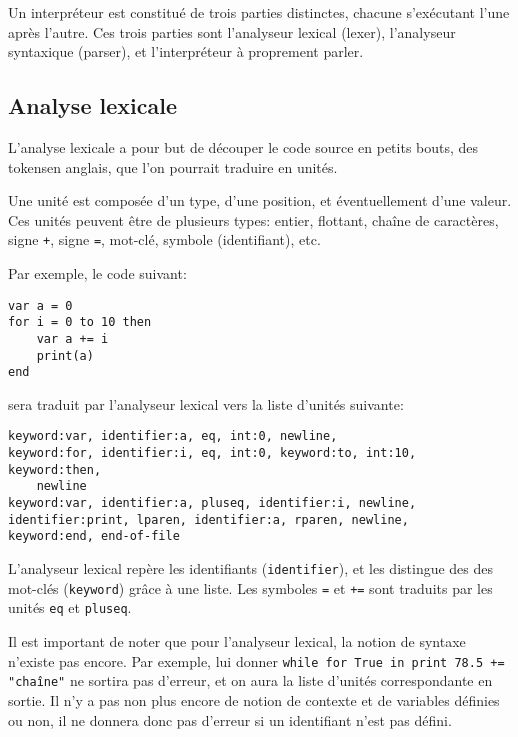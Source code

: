 \documentclass{article}
\begin{document}
Un interpréteur est constitué de trois parties distinctes, chacune s’exécutant l’une après l’autre.
Ces trois parties sont l’analyseur lexical (lexer), l’analyseur syntaxique (parser), et l’interpréteur
à proprement parler.

\subsection{Analyse lexicale}
L’analyse lexicale a pour but de découper le code source en petits bouts, des 
\guillemetleft\nobreakspace tokens\nobreakspace\guillemetright\nobreakspace en anglais,
que l’on pourrait traduire en
\guillemetleft\nobreakspace unités\nobreakspace\guillemetright\nobreakspace.

Une unité est composée d’un type, d’une position, et éventuellement d’une valeur.
Ces unités peuvent être de plusieurs types\nobreakspace: entier, flottant, chaîne de caractères,
signe \verb|+|, signe \verb|=|, mot-clé, symbole (identifiant), etc.

Par exemple, le code suivant\nobreakspace:

\begin{lstlisting}
var a = 0
for i = 0 to 10 then
    var a += i
    print(a)
end
\end{lstlisting}

sera traduit par l’analyseur lexical vers la liste d’unités suivante\nobreakspace:

\begin{lstlisting}
keyword:var, identifier:a, eq, int:0, newline,
keyword:for, identifier:i, eq, int:0, keyword:to, int:10, keyword:then,
    newline
keyword:var, identifier:a, pluseq, identifier:i, newline,
identifier:print, lparen, identifier:a, rparen, newline,
keyword:end, end-of-file
\end{lstlisting}

L’analyseur lexical repère les identifiants (\verb|identifier|), et les distingue des
des mot-clés (\verb|keyword|) grâce à une liste. Les symboles \verb|=| et \verb|+=| sont
traduits par les unités \verb|eq| et \verb|pluseq|.

Il est important de noter que pour l’analyseur lexical, la notion de syntaxe n’existe pas encore.
Par exemple, lui donner \verb|while for True in print 78.5 += "chaîne"| ne sortira pas d’erreur,
et on aura la liste d’unités correspondante en sortie. Il n’y a pas non plus encore de notion de
contexte et de variables définies ou non, il ne donnera donc pas d’erreur si un identifiant n’est
pas défini.
\end{document}
